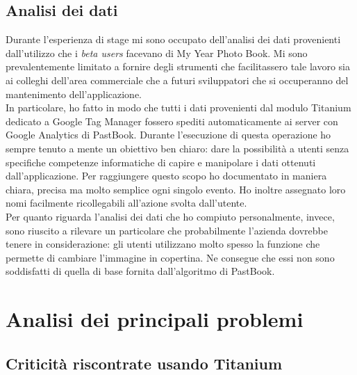 		\subsection{Analisi dei dati}
			Durante l'esperienza di stage mi sono occupato dell'analisi dei dati provenienti dall'utilizzo che i
			\emph{beta users} facevano di My Year Photo Book. Mi sono prevalentemente limitato a fornire degli strumenti che
			facilitassero tale lavoro sia ai colleghi dell'area commerciale che a futuri sviluppatori che si occuperanno del mantenimento
			dell'applicazione.\\
			In particolare, ho fatto in modo che tutti i dati provenienti dal modulo Titanium dedicato a Google Tag Manager fossero
			spediti automaticamente ai server con Google Analytics di PastBook. Durante l'esecuzione di questa operazione ho sempre
			tenuto a mente un obiettivo ben chiaro: dare la possibilità a utenti senza specifiche competenze informatiche di capire e
			manipolare i dati ottenuti dall'applicazione. Per raggiungere questo scopo ho documentato in maniera chiara, precisa ma molto
			semplice ogni singolo evento. Ho inoltre assegnato loro nomi facilmente ricollegabili all'azione svolta dall'utente.\\
			Per quanto riguarda l'analisi dei dati che ho compiuto personalmente, invece, sono riuscito a rilevare un particolare
			che probabilmente l'azienda dovrebbe tenere in considerazione: gli utenti utilizzano molto spesso la funzione che permette
			di cambiare l'immagine in copertina. Ne consegue che essi non sono soddisfatti di quella di base fornita dall'algoritmo
			di PastBook.
	\section{Analisi dei principali problemi}
		\subsection{Criticità riscontrate usando Titanium}
